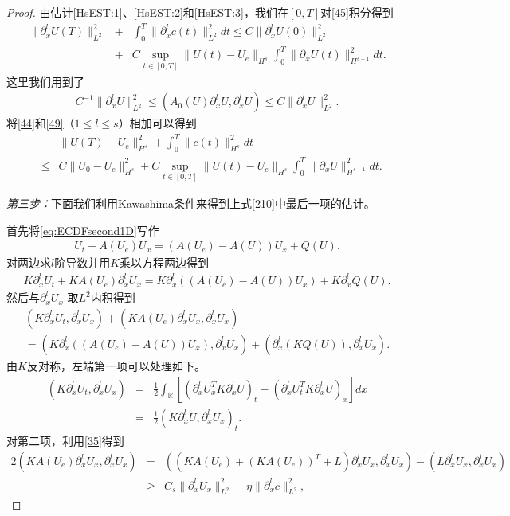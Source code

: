 \begin{proof}
由估计\eqref{HsEST:1}、\eqref{HsEST:2}和\eqref{HsEST:3}，我们在$[0,T]$对\eqref{45}积分得到
\begin{eqnarray}\label{49}
  \|\partial^l_x U(T)\|_{L^2}^2&  + & \int_0^T \|\partial^l_x c(t)\|^2_{L^2}dt \le C\|\partial^l_x U(0)\|_{L^2}^2  \nonumber\\[3mm]
 & +& C\sup_{t \in [0,T]}\|U(t)-U_e\|_{H^s} \int_0^T \|\partial_x U(t)\|^2_{H^{s-1}}dt .
\end{eqnarray}
这里我们用到了
\begin{eqnarray*}
   C^{-1} \|\partial^l_x U\|_{L^2}^2 \le  (A_0(U) \partial^l_x U,\partial^l_x U) \le C \|\partial^l_x U\|_{L^2}^2.
\end{eqnarray*}
将\eqref{44}和\eqref{49}（$1 \le l \le s$）相加可以得到
  \begin{eqnarray}\label{210}
    && \|U(T)-U_e\|^2_{H^{s}}  +  \int_0^T \|c(t)\|^2_{H^s} dt \nonumber \\
    & \le & C \|U_0-U_e\|_{H^{s}}^2 + C \sup_{t \in [0,T]} \|U(t) - U_e\|_{H^s} \int_0^T \|\partial_x U\|_{H^{s-1}}^2dt.
\end{eqnarray}

\emph{第三步：}下面我们利用Kawashima条件来得到上式\eqref{210}中最后一项的估计。

首先将\eqref{eq:ECDFsecond1D}写作
\begin{eqnarray*}
  U_t + A(U_e) U_x  = (A(U_e) -A(U))U_x + Q(U).
\end{eqnarray*}
对两边求$l$阶导数并用$K$乘以方程两边得到
\begin{eqnarray*}
  K \partial^l_x U_t + K A(U_e) \partial^l_x U_x  = K \partial^l_x ((A(U_e)-A(U))U_x) + K\partial^l_x Q(U).
\end{eqnarray*}
然后与$\partial^l_x U_x$ 取$L^2$内积得到
\begin{eqnarray}\label{211}
  (K \partial^l_x U_t, \partial^l_x U_x) + (KA(U_e) \partial^l_x U_x, \partial^l_x U_x) \nonumber \\ = (K \partial^l_x((A(U_e)-A(U))U_x),\partial^l_x U_x) + (\partial^l_x( K Q(U) ),\partial^l_x U_x).
\end{eqnarray}
由$K$反对称，左端第一项可以处理如下。
\begin{eqnarray}\label{212}
  (K\partial^l_x U_t, \partial^l_x U_x) &=& \frac{1}{2} \int_\mathbb{R} \left[(\partial^l_x U^T_x K \partial^l_x U )_t -  (\partial^l_x U_t^T K\partial^l_x U  )_x \right]dx  \nonumber \\
  &=& \frac{1}{2}(K \partial^l_x U,\partial^l_x U_x)_t .
\end{eqnarray}
对第二项，利用\eqref{35}得到
\begin{eqnarray}\label{213}
  2(KA(U_e) \partial^l_x U_x,\partial^l_x U_x) &=& ( (KA(U_e)+ (K A(U_e))^T +\bar{L}) \partial^l_x U_x, \partial^l_x U_x) - (\bar{L}\partial^l_x U_x, \partial^l_x U_x) \nonumber\\
  &\ge& C_s \|\partial^l_x U_x \|^2_{L^2} -\eta \|\partial^l_x c\|^2_{L^2},
\end{eqnarray}


\end{proof}

